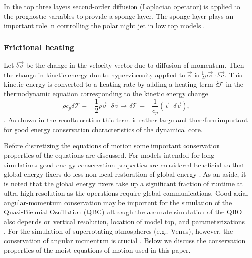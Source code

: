 \documentclass{agujournal}
\begin{document}
{In the top three layers second-order diffusion (Laplacian operator) is applied to the prognostic variables to provide a sponge layer. The sponge layer plays an important role in controlling the polar night jet in low top models \citep[see, e.g., ][]{L2011IJHPC}.

%
\subsubsection{Frictional heating}\label{sec:frictional_heating}
Let $\delta \vec{v}$ be the change in the velocity vector due to diffusion of momentum. Then the change in kinetic energy due to hyperviscosity applied to $\vec{v}$ is $\frac{1}{2}\rho \vec{v} \cdot \delta \vec{v}$. This kinetic energy is converted to a heating rate by adding a heating term $\delta \mathcal{T}$ in the thermodynamic equation corresponding to the kinetic energy change
\begin{equation}
\rho c_p \delta \mathcal{T}=-\frac{1}{2}\rho \vec{v} \cdot \delta \vec{v} \Rightarrow
 \delta \mathcal{T}=-\frac{1}{c_p}\left(\vec{v}\cdot \delta \vec{v}\right),\label{eq:tcp}
\end{equation}
\citep[p.71 in ][]{CAM5}. As shown in the results section this term is rather large and therefore important for good energy conservation characteristics of the dynamical core.

Before discretizing the equations of motion some important conservation properties of the equations are discussed. For models intended for long simulations good energy conservation properties are considered beneficial so that global energy fixers do less non-local restoration of global energy \citep[e.g.][]{T2008JCP}. As an aside, it is noted that the global energy fixers take up a significant fraction of runtime at ultra-high resolution as the operations require global communications. Good axial angular-momentum conservation may be important for the simulation of the Quasi-Biennial Oscillation (QBO) although the accurate simulation of the QBO also depends on vertical resolution, location of model top, and parameterizations \citep[such as nonorographic gravity wave drag; ][]{RSB2014JGR}. For the simulation of superrotating atmospheres (e.g., Venus), however, the conservation of angular momentum is crucial \citep{LCGPSWLJ2012JGR}. Below we discuss the conservation properties of the moist equations of motion used in this paper.
}
\end{document}
